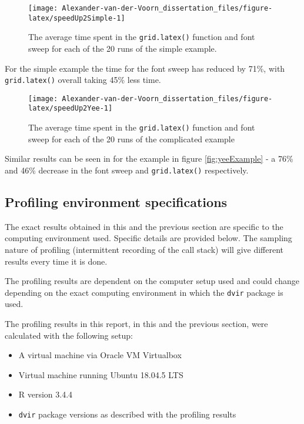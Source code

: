 \documentclass[]{article}
\providecommand{\tightlist}{%
  \setlength{\itemsep}{0pt}\setlength{\parskip}{0pt}}
\begin{document}
\begin{figure}

{\centering \texttt{[image: Alexander-van-der-Voorn\_dissertation\_files/figure-latex/speedUp2Simple-1]} 

}

\caption{The average time spent in the \texttt{grid.latex()} function and font sweep for each of the 20 runs of the simple example.}\label{fig:speedUp2Simple}
\end{figure}

For the simple example the time for the font sweep has reduced by 71\%,
with \texttt{grid.latex()} overall taking 45\% less time.

\begin{figure}

{\centering \texttt{[image: Alexander-van-der-Voorn\_dissertation\_files/figure-latex/speedUp2Yee-1]} 

}

\caption{The average time spent in the \texttt{grid.latex()} function and font sweep for each of the 20 runs of the complicated example}\label{fig:speedUp2Yee}
\end{figure}

Similar results can be seen in for the example in figure
\ref{fig:yeeExample} - a 76\% and 46\% decrease in the font sweep and
\texttt{grid.latex()} respectively.

\subsection{Profiling environment
specifications}\label{profiling-environment-specifications}

The exact results obtained in this and the previous section are specific
to the computing environment used. Specific details are provided below.
The sampling nature of profiling (intermittent recording of the call
stack) will give different results every time it is done.

The profiling results are dependent on the computer setup used and could
change depending on the exact computing environment in which the
\texttt{dvir} package is used.

The profiling results in this report, in this and the previous section,
were calculated with the following setup:

\begin{itemize}
\tightlist
\item
  A virtual machine via Oracle VM Virtualbox
\item
  Virtual machine running Ubuntu 18.04.5 LTS
\item
  R version 3.4.4
\item
  \texttt{dvir} package versions as described with the profiling results
\end{itemize}
\end{document}
